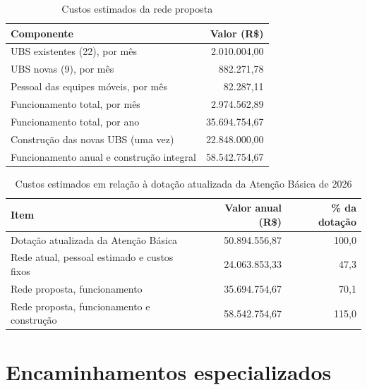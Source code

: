 \begin{table}[htbp]\centering
\caption{Custos estimados da rede proposta}\label{tab:custos}
\begin{tabular}{lr}\toprule Componente & Valor (R\$)\\\midrule
UBS existentes (22), por mês & 2.010.004,00\\
UBS novas (9), por mês & 882.271,78\\
Pessoal das equipes móveis, por mês & 82.287,11\\
Funcionamento total, por mês & 2.974.562,89\\
Funcionamento total, por ano & 35.694.754,67\\
Construção das novas UBS (uma vez) & 22.848.000,00\\
Funcionamento anual e construção integral & 58.542.754,67\\
\bottomrule\end{tabular}
\end{table}

\begin{table}[htbp]\centering
\caption{Custos estimados em relação à dotação atualizada da Atenção Básica de 2026}\label{tab:orcamento}
\begin{tabular}{lrr}\toprule Item & Valor anual (R\$) & \% da dotação\\\midrule
Dotação atualizada da Atenção Básica & 50.894.556,87 & 100,0\\
Rede atual, pessoal estimado e custos fixos & 24.063.853,33 & 47,3\\
Rede proposta, funcionamento & 35.694.754,67 & 70,1\\
Rede proposta, funcionamento e construção & 58.542.754,67 & 115,0\\
\bottomrule\end{tabular}
\end{table}

\section{Encaminhamentos especializados}\label{sec:encaminhamentos}

